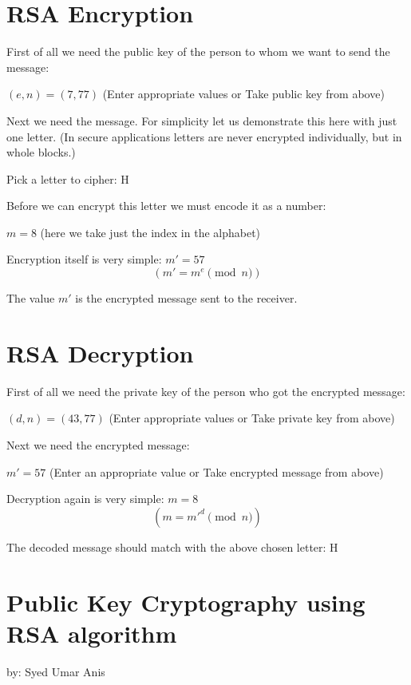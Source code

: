 \documentclass{article}
\begin{document}
\newpage


\section*{RSA Encryption}

First of all we need the public key of the person to whom we want to send the message:

$(e, n) = (7, 77)$ (Enter appropriate values or Take public key from above)

Next we need the message. For simplicity let us demonstrate this here with just one letter. (In secure applications letters are never encrypted individually, but in whole blocks.)

Pick a letter to cipher: H

Before we can encrypt this letter we must encode it as a number:

$m = 8$ (here we take just the index in the alphabet)

Encryption itself is very simple: $m' = 57$ \[ (m' = m^e \pmod n) \]

The value $m'$ is the encrypted message sent to the receiver.

\vspace{10mm}

\section*{RSA Decryption}

First of all we need the private key of the person who got the encrypted message:

$(d, n) = (43, 77)$ (Enter appropriate values or Take private key from above)

Next we need the encrypted message:

$m' = 57$ (Enter an appropriate value or Take encrypted message from above)

Decryption again is very simple: $m = 8$ \[ (m = m'^d \pmod n) \]

The decoded message should match with the above chosen letter: H

\newpage


\section*{Public Key Cryptography using RSA algorithm}
by: Syed Umar Anis
\end{document}
